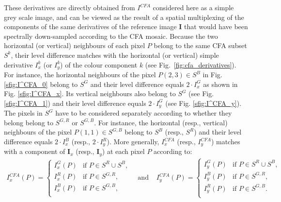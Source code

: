 \documentclass[twoside]{article}
\begin{document}
\noindent These derivatives are directly obtained from $I^{CFA}$ considered here as a simple grey scale image, and can be viewed as the result of a spatial multiplexing of the components of the same derivatives of the reference image $\mathbf{I}$ that would have been spectrally down-sampled according to the CFA mosaic.
Because the two horizontal (or vertical) neighbours of each pixel $P$ belong to the same CFA subset $S^k$, their level difference matches with the horizontal (or vertical) simple derivative $I^k_x$ (or $I^k_y$) of the colour component $k$ (see Fig.~\ref{fig:cfa_derivatives}). For instance, the horizontal neighbours of the pixel $P(2,3) \in S^B$ in Fig. \ref{sfig:I^CFA_0} belong to $S^G$ and their level difference equals $2 \cdot I^G_x$ as shown in Fig. \ref{sfig:I^CFA_x}. Its vertical neighbours also belong to $S^G$ (see Fig. \ref{sfig:I^CFA_1}) and their level difference equals $2 \cdot I^G_y$ (see Fig. \ref{sfig:I^CFA_y}). The pixels in $S^G$ have to be considered separately according to whether they belong belong to $S^{G,R}$ or $S^{G,B}$. For instance, the horizontal (resp., vertical) neighbours of the pixel $P(1,1) \in S^{G,B}$ belong to $S^B$ (resp., $S^R$) and their level difference equals  $2 \cdot I^B_x$ (resp.,  $2 \cdot I^R_y$). More generally, $I^{CFA}_x$ (resp., $I^{CFA}_y$) matches with a component of $\mathbf{I}_x$ (resp., $\mathbf{I}_y$) at each pixel $P$ according to:
\begin{equation}
	\begin{array}{lcl}
		I^{CFA}_x(P) = \left\lbrace
		\begin{array}{cl}
			I^G_x(P)  & \text{if $P \in S^R \cup S^B$,}\\ 
			I^R_x(P)  & \text{if $P \in S^{G,R}$,} \\
			I^B_x(P)  & \text{if $P \in S^{G,B}$,}\\
		\end{array}\right.
		& \text{ and } &
		I^{CFA}_y(P) = \left\lbrace
		\begin{array}{cl}
			I^G_y(P)  & \text{if $P \in S^R \cup S^B$,}\\ 
			I^B_y(P)  & \text{if $P \in S^{G,R}$,} \\
			I^R_y(P)  & \text{if $P \in S^{G,B}$.}\\
		\end{array}\right.
	\end{array}
	\label{eq:cfa_derivatives}
\end{equation}
\end{document}
